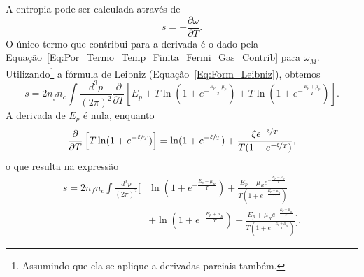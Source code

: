 A entropia pode ser calculada através de
\begin{equation}
	s = -\frac{\partial \omega}{\partial T}.
\end{equation}
%
O único termo que contribui para a derivada é o dado pela Equação~\eqref{Eq:Por_Termo_Temp_Finita_Fermi_Gas_Contrib} para $\omega_M$. Utilizando\footnote{Assumindo que ela se aplique a derivadas parciais também.} a fórmula de Leibniz (Equação~\eqref{Eq:Form_Leibniz}), obtemos
\begin{equation}
	s = 2 n_f n_c \int\frac{d^3p}{(2\pi)^2} \frac{\partial}{\partial T} \left[E_p + T \ln(1 + e^{-\frac{E_p - \mu_p}{T}}) + T \ln(1 + e^{-\frac{E_p + \mu_p}{T}})\right].
\end{equation}
%
A derivada de $E_p$ é nula, enquanto
\begin{equation}
	\frac{\partial}{\partial T}\left[T \ln(1 + e^{-\nicefrac{\xi}{T}})\right] = \ln (1 + e^{-\nicefrac{\xi}{T}}) + \frac{\xi e^{-\nicefrac{\xi}{T}}}{T(1+e^{-\nicefrac{\xi}{T}})} ,
\end{equation}
%
o que resulta na expressão
\begin{equation}\label{Eq:Densidade_de_entropia_deriv}
\begin{split}
	s = 2 n_f n_c \int\frac{d^3p}{(2\pi)^2} \Big[&\ln (1 + e^{-\frac{E_p - \mu_R}{T}}) + \frac{E_p - \mu_R e^{-\frac{E_p - \mu_R}{T}}}{T(1+e^{-\frac{E_p - \mu_R}{T}})} \\
	 &+ \ln (1 + e^{-\frac{E_p + \mu_R}{T}}) + \frac{E_p + \mu_R e^{-\frac{E_p + \mu_R}{T}}}{T(1+e^{-\frac{E_p + \mu_R}{T}})}\Big].
\end{split}
\end{equation}

